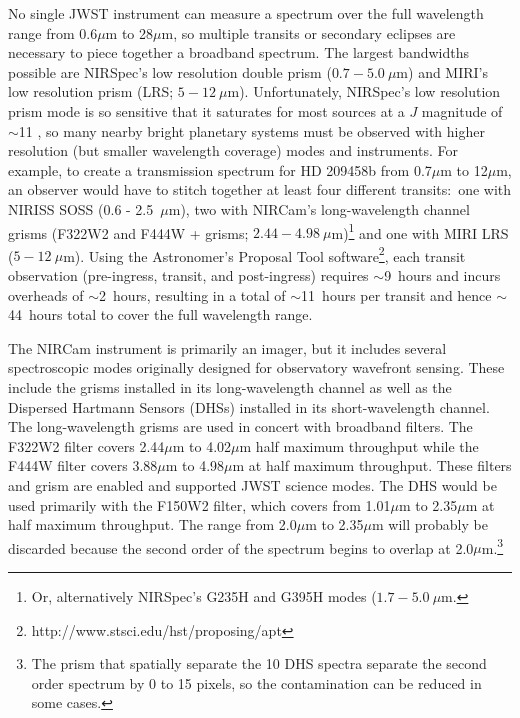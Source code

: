 \documentclass[iop]{emulateapj}
\newcommand{\SOSSrange}{0.6 - 2.5~$\mu$m}
\begin{document}
No single JWST instrument can measure a spectrum over the full wavelength range from 0.6$\mu$m to 28$\mu$m, so multiple transits or secondary eclipses are necessary to piece together a broadband spectrum.
The largest bandwidths possible are NIRSpec's low resolution double prism ($0.7-5.0~\mu$m) and MIRI's low resolution prism (LRS; $5-12~\mu$m).
Unfortunately, NIRSpec's low resolution prism mode is so sensitive that it saturates for most sources at a $J$ magnitude of $\sim$11 \citep{beichman2014pasp}, so many nearby bright planetary systems must be observed with higher resolution (but smaller wavelength coverage) modes and instruments.
For example, to create a transmission spectrum for HD 209458b \citep{henry00,charbonneau00} from 0.7$\mu$m to 12$\mu$m, an observer would have to stitch together at least four different transits:\ one with NIRISS SOSS (\SOSSrange), two with NIRCam's long-wavelength channel grisms (F322W2 and F444W + grisms; $2.44-4.98~\mu$m)\footnote{Or, alternatively NIRSpec's G235H and G395H modes ($1.7-5.0~\mu$m.} and one with MIRI LRS ($5-12~\mu$m).
Using the Astronomer's Proposal Tool software\footnote{http://www.stsci.edu/hst/proposing/apt}, each transit observation (pre-ingress, transit, and post-ingress) requires $\sim$9~hours and incurs overheads of $\sim$2~hours, resulting in a total of $\sim$11~hours per transit and hence $\sim$44~hours total to cover
the full wavelength range.

The NIRCam instrument is primarily an imager, but it includes several spectroscopic modes originally designed for observatory wavefront sensing.
These include the grisms installed in its long-wavelength channel as well as the Dispersed Hartmann Sensors (DHSs) installed in its short-wavelength channel.
The long-wavelength grisms are used in concert with broadband filters.
The F322W2 filter covers 2.44$\mu$m to 4.02$\mu$m half maximum throughput while the F444W filter covers 3.88$\mu$m to 4.98$\mu$m at half maximum throughput.
These filters and grism are enabled and supported JWST science modes.
The DHS would be used primarily with the F150W2 filter, which covers from 1.01$\mu$m to 2.35$\mu$m at half maximum throughput.
The range from 2.0$\mu$m to 2.35$\mu$m will probably be discarded because the second order of the spectrum begins to overlap at 2.0$\mu$m.\footnote{The prism that spatially separate the 10 DHS spectra separate the second order spectrum by 0 to 15 pixels, so the contamination can be reduced in some cases.}


\end{document}
